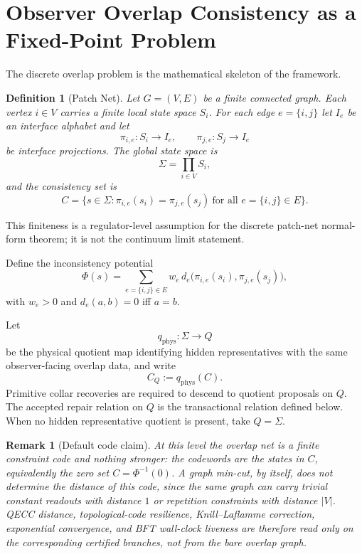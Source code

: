 \documentclass[11pt]{article}
\newtheorem{definition}[theorem]{Definition}
\newtheorem{remark}[theorem]{Remark}
\begin{document}
\section{Observer Overlap Consistency as a Fixed-Point Problem}

The discrete overlap problem is the mathematical skeleton of the framework.

\begin{definition}[Patch Net]\label{def:patchnet}
Let $G=(V,E)$ be a finite connected graph. Each vertex $i\in V$ carries a finite local state space $S_i$. For each edge $e=\{i,j\}$ let $I_e$ be an interface alphabet and let
\[
\pi_{i,e}:S_i\to I_e,
\qquad
\pi_{j,e}:S_j\to I_e
\]
be interface projections. The global state space is
\[
\Sigma=\prod_{i\in V} S_i,
\]
and the consistency set is
\[
C=\bigl\{s\in\Sigma:\pi_{i,e}(s_i)=\pi_{j,e}(s_j)\ \text{for all }e=\{i,j\}\in E\bigr\}.
\]
\end{definition}

This finiteness is a regulator-level assumption for the discrete patch-net normal-form theorem; it is not the continuum limit statement.

Define the inconsistency potential
\[
\Phi(s)=\sum_{e=\{i,j\}\in E}w_e\, d_e\!\bigl(\pi_{i,e}(s_i),\pi_{j,e}(s_j)\bigr),
\]
with $w_e>0$ and $d_e(a,b)=0$ iff $a=b$.

Let
\[
q_{\mathrm{phys}}:\Sigma\to Q
\]
be the physical quotient map identifying hidden representatives with the same observer-facing
overlap data, and write
\[
C_Q:=q_{\mathrm{phys}}(C).
\]
Primitive collar recoveries are required to descend to quotient proposals on \(Q\). The accepted
repair relation on \(Q\) is the transactional relation defined below. When no hidden
representative quotient is present, take \(Q=\Sigma\).

\begin{remark}[Default code claim]\label{rem:constraint-code-firewall}
At this level the overlap net is a finite constraint code and nothing stronger: the codewords are
the states in \(C\), equivalently the zero set \(C=\Phi^{-1}(0)\). A graph min-cut, by itself,
does not determine the distance of this code, since the same graph can carry trivial constant
readouts with distance \(1\) or repetition constraints with distance \(|V|\). QECC distance,
topological-code resilience, Knill--Laflamme correction, exponential convergence, and BFT
wall-clock liveness are therefore read only on the corresponding certified branches, not from the
bare overlap graph.
\end{remark}
\end{document}
